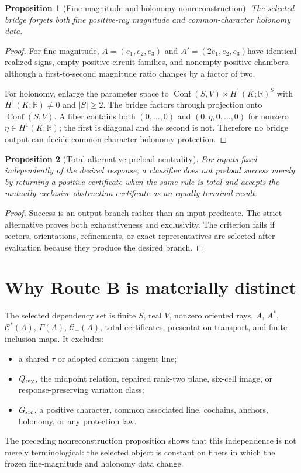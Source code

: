 \documentclass[11pt]{article}
\newtheorem{proposition}{Proposition}
\newcommand{\R}{\mathbb{R}}
\newcommand{\Cstar}{\mathcal{C}^{*}}
\newcommand{\Cplus}{\mathcal{C}_{+}}
\newcommand{\GammaA}{\Gamma}
\begin{document}
\begin{proposition}[Fine-magnitude and holonomy nonreconstruction]
The selected bridge forgets both fine positive-ray magnitude and
common-character holonomy data.
\end{proposition}
\begin{proof}
For fine magnitude, \(A=(e_1,e_2,e_3)\) and
\(A'=(2e_1,e_2,e_3)\)\space have identical realized signs, empty positive-circuit
families, and nonempty positive chambers, although a first-to-second magnitude
ratio changes by a factor of two.

For holonomy, enlarge the parameter space to
\(\operatorname{Conf}(S,V)\times H^1(K;\R)^S\) with
\(H^1(K;\R)\ne0\) and \(|S|\ge2\).  The bridge factors through projection onto
\(\operatorname{Conf}(S,V)\).  A fiber contains both
\((0,\ldots,0)\) and \((0,\eta,0,\ldots,0)\) for nonzero
\(\eta\in H^1(K;\R)\); the first is diagonal and the second is not.  Therefore
no bridge output can decide common-character holonomy protection.
\end{proof}

\begin{proposition}[Total-alternative preload neutrality]
For inputs fixed independently of the desired response, a classifier does not
preload success merely by returning a positive certificate when the same rule
is total and accepts the mutually exclusive obstruction certificate as an
equally terminal result.
\end{proposition}
\begin{proof}
Success is an output branch rather than an input predicate.  The strict
alternative proves both exhaustiveness and exclusivity.  The criterion fails
if sectors, orientations, refinements, or exact representatives are selected
after evaluation because they produce the desired branch.
\end{proof}

\section{Why Route B is materially distinct}

The selected dependency set is finite \(S\), real \(V\), nonzero oriented rays,
\(A\), \(A^*\), \(\Cstar(A)\), \(\GammaA(A)\), \(\Cplus(A)\), total
certificates, presentation transport, and finite inclusion maps.  It excludes:
\begin{itemize}
  \item a shared \(\tau\) or adopted common tangent line;
  \item \(Q_{\rm ray}\), the midpoint relation, repaired rank-two plane,
        six-cell image, or response-preserving variation class;
  \item \(G_{\rm src}\), a positive character, common associated line,
        cochains, anchors, holonomy, or any protection law.
\end{itemize}
The preceding nonreconstruction proposition shows that this independence is
not merely terminological: the selected object is constant on fibers in which
the frozen fine-magnitude and holonomy data change.
\end{document}
